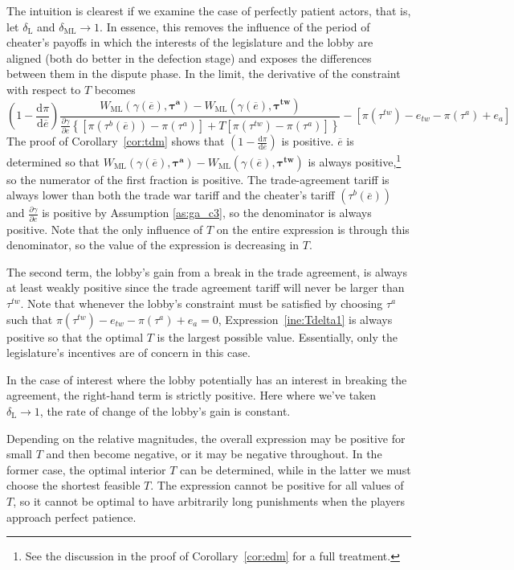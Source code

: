 \documentclass[authoryear, review]{elsarticle}
\newcommand{\ov}{\overline}
\newcommand{\bta}{\bm{\tau^a}}
\newcommand{\ga}{\gamma}
\newcommand{\btw}{\bm{\tau^{tw}}}
\newcommand{\de}{\delta}
\begin{document}
The intuition is clearest if we examine the case of perfectly patient actors, that is, let $\de_\text{L}$ and $\de_\text{ML} \rightarrow 1$. In essence, this removes the influence of the period of cheater's payoffs in which the interests of the legislature and the lobby are aligned (both do better in the defection stage) and exposes the differences between them in the dispute phase. In the limit, the derivative of the constraint with respect to $T$ becomes
\begin{equation}
  \left(1 - \frac{\mathrm{d} \pi}{\mathrm{d} \ov{e}} \right) \frac{ W_\text{ML}(\ga(\ov{e}),\bta) - W_\text{ML}(\ga(\ov{e}),\btw) }{\frac{\partial \ga}{\partial e} \left\{
  \left[ \pi(\tau^b(\ov{e})) - \pi(\tau^a) \right] + T \left[ \pi(\tau^{tw}) - \pi(\tau^a) \right]\right\}} - \left[ \pi(\tau^{tw}) - e_{tw} -\pi(\tau^a) + e_a \right]
 	\label{ine:Tdelta1}
\end{equation}
The proof of Corollary~\ref{cor:tdm} shows that $\left(1 - \frac{\mathrm{d} \pi}{\mathrm{d} \ov{e}} \right)$ is positive. $\ov{e}$ is determined so that $W_\text{ML}(\ga(\ov{e}),\bta) - W_\text{ML}(\ga(\ov{e}),\btw)$ is always positive,\footnote{See the discussion in the proof of Corollary~\ref{cor:edm} for a full treatment.} so the numerator of the first fraction is positive. The trade-agreement tariff is always lower than both the trade war tariff and the cheater's tariff $\left(\tau^b\left(\ov{e}\right)\right)$ and $\frac{\partial \ga}{\partial e}$ is positive by Assumption \ref{as:ga_c3}, so the denominator is always positive. Note that the only influence of $T$ on the entire expression is through this denominator, so the value of the expression is decreasing in $T$.

The second term, the lobby's gain from a break in the trade agreement, is always at least weakly positive since the trade agreement tariff will never be larger than $\tau^{tw}$. Note that whenever the lobby's constraint must be satisfied by choosing $\tau^a$ such that $\pi(\tau^{tw}) - e_{tw} -\pi(\tau^a) + e_a =0$, Expression~\ref{ine:Tdelta1} is always positive so that the optimal $T$ is the largest possible value. Essentially, only the legislature's incentives are of concern in this case.

In the case of interest where the lobby potentially has an interest in breaking the agreement, the right-hand term is strictly positive. Here where we've taken $\de_\text{L} \rightarrow 1$, the rate of change of the lobby's gain is constant.

Depending on the relative magnitudes, the overall expression may be positive for small $T$ and then become negative, or it may be negative throughout. In the former case, the optimal interior $T$ can be determined, while in the latter we must choose the shortest feasible $T$. The expression cannot be positive for all values of $T$, so it cannot be optimal to have arbitrarily long punishments when the players approach perfect patience.
\end{document}
